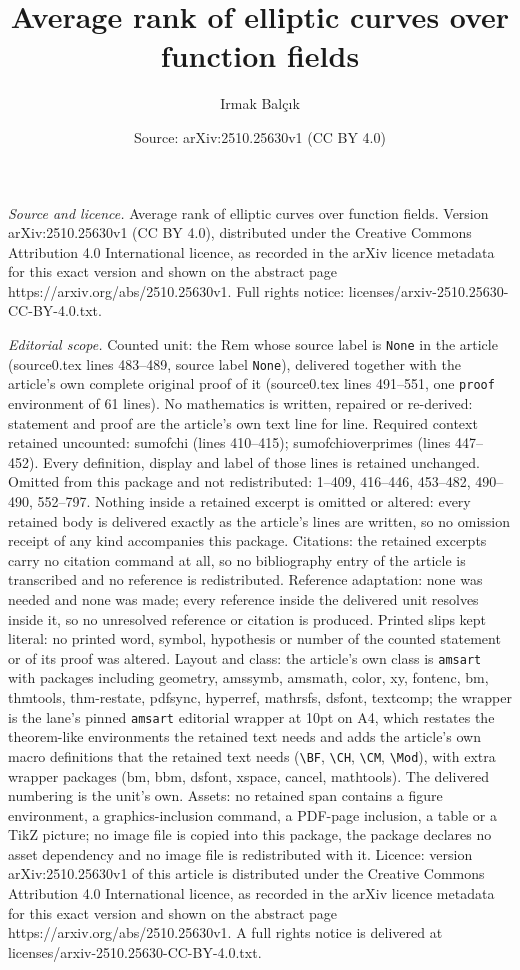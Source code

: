 \documentclass[10pt,a4paper]{amsart}
\title[Average rank of elliptic curves over function fields]{Average rank of elliptic curves over function fields}
\author{Irmak Bal\c{c}{\i}k}
\date{Source: arXiv:2510.25630v1 (CC BY 4.0)}
\begin{document}
\maketitle

\noindent\emph{Source and licence.} Average rank of elliptic curves over function fields. Version arXiv:2510.25630v1 (CC BY 4.0), distributed under the Creative Commons Attribution 4.0 International licence, as recorded in the arXiv licence metadata for this exact version and shown on the abstract page https://arxiv.org/abs/2510.25630v1. Full rights notice: licenses/arxiv-2510.25630-CC-BY-4.0.txt.\par\smallskip

\noindent\textit{Editorial scope.} Counted unit: the Rem whose source label is \texttt{None} in the article (source0.tex lines 483--489, source label \texttt{None}), delivered together with the article's own complete original proof of it (source0.tex lines 491--551, one \texttt{proof} environment of 61 lines). No mathematics is written, repaired or re-derived: statement and proof are the article's own text line for line. Required context retained uncounted: sumofchi (lines 410--415); sumofchioverprimes (lines 447--452). Every definition, display and label of those lines is retained unchanged. Omitted from this package and not redistributed: 1--409, 416--446, 453--482, 490--490, 552--797. Nothing inside a retained excerpt is omitted or altered: every retained body is delivered exactly as the article's lines are written, so no omission receipt of any kind accompanies this package. Citations: the retained excerpts carry no citation command at all, so no bibliography entry of the article is transcribed and no reference is redistributed. Reference adaptation: none was needed and none was made; every reference inside the delivered unit resolves inside it, so no unresolved reference or citation is produced. Printed slips kept literal: no printed word, symbol, hypothesis or number of the counted statement or of its proof was altered. Layout and class: the article's own class is \texttt{amsart} with packages including geometry, amssymb, amsmath, color, xy, fontenc, bm, thmtools, thm-restate, pdfsync, hyperref, mathrsfs, dsfont, textcomp; the wrapper is the lane's pinned \texttt{amsart} editorial wrapper at 10pt on A4, which restates the theorem-like environments the retained text needs and adds the article's own macro definitions that the retained text needs (\texttt{\textbackslash BF}, \texttt{\textbackslash CH}, \texttt{\textbackslash CM}, \texttt{\textbackslash Mod}), with extra wrapper packages (bm, bbm, dsfont, xspace, cancel, mathtools). The delivered numbering is the unit's own. Assets: no retained span contains a figure environment, a graphics-inclusion command, a PDF-page inclusion, a table or a TikZ picture; no image file is copied into this package, the package declares no asset dependency and no image file is redistributed with it. Licence: version arXiv:2510.25630v1 of this article is distributed under the Creative Commons Attribution 4.0 International licence, as recorded in the arXiv licence metadata for this exact version and shown on the abstract page https://arxiv.org/abs/2510.25630v1. A full rights notice is delivered at licenses/arxiv-2510.25630-CC-BY-4.0.txt. 
\end{document}
